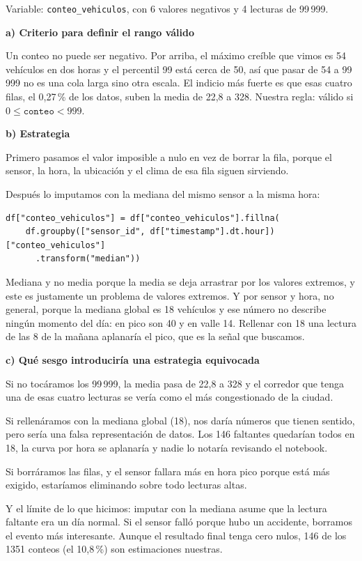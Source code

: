 \documentclass[11pt]{article}
\begin{document}
\begin{respuesta}[Respuesta 2.5]
Variable: \texttt{conteo\_vehiculos}, con 6 valores negativos y 4 lecturas de 99\,999.

\medskip
\noindent\textbf{a) Criterio para definir el rango válido}

Un conteo no puede ser negativo. Por arriba, el máximo creíble que vimos es 54 vehículos en dos horas y el percentil 99 está cerca de 50, así que pasar de 54 a 99\,999 no es una cola larga sino otra escala. El indicio más fuerte es que esas cuatro filas, el 0,27\,\% de los datos, suben la media de 22,8 a 328. Nuestra regla: válido si $0 \leq \texttt{conteo} < 999$.

\medskip
\noindent\textbf{b) Estrategia}

Primero pasamos el valor imposible a nulo en vez de borrar la fila, porque el sensor, la hora, la ubicación y el clima de esa fila siguen sirviendo.

Después lo imputamos con la mediana del mismo sensor a la misma hora:
\begin{verbatim}
df["conteo_vehiculos"] = df["conteo_vehiculos"].fillna(
    df.groupby(["sensor_id", df["timestamp"].dt.hour])["conteo_vehiculos"]
      .transform("median"))
\end{verbatim}

Mediana y no media porque la media se deja arrastrar por los valores extremos, y este es justamente un problema de valores extremos. Y por sensor y hora, no general, porque la mediana global es 18 vehículos y ese número no describe ningún momento del día: en pico son 40 y en valle 14. Rellenar con 18 una lectura de las 8 de la mañana aplanaría el pico, que es la señal que buscamos.

\medskip
\noindent\textbf{c) Qué sesgo introduciría una estrategia equivocada}

Si no tocáramos los 99\,999, la media pasa de 22,8 a 328 y el corredor que tenga una de esas cuatro lecturas se vería como el más congestionado de la ciudad.

Si rellenáramos con la mediana global (18), nos daría números que tienen sentido, pero sería una falsa representación de datos. Los 146 faltantes quedarían todos en 18, la curva por hora se aplanaría y nadie lo notaría revisando el notebook.

Si borráramos las filas, y el sensor fallara más en hora pico porque está más exigido, estaríamos eliminando sobre todo lecturas altas.

\medskip
\noindent Y el límite de lo que hicimos: imputar con la mediana asume que la lectura faltante era un día normal. Si el sensor falló porque hubo un accidente, borramos el evento más interesante. Aunque el resultado final tenga cero nulos, 146 de los 1351 conteos (el 10,8\,\%) son estimaciones nuestras.
\end{respuesta}
\end{document}
